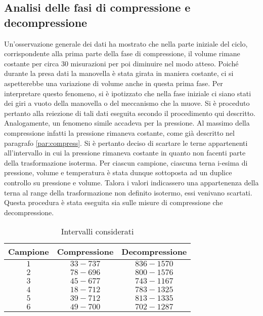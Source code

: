 \documentclass[a4paper,11pt,oneside]{article}
\begin{document}
\subsection{Analisi delle fasi di compressione e decompressione}
Un'osservazione generale dei dati ha mostrato che nella parte iniziale del ciclo, corrispondente alla prima parte della fase di compressione, il volume rimane costante per circa 30 misurazioni per poi diminuire nel modo atteso. Poiché durante la presa dati la manovella è stata girata in maniera costante, ci si aspetterebbe una variazione di volume anche in questa prima fase. Per interpretare questo fenomeno, si è ipotizzato che nella fase iniziale ci siano stati dei giri a vuoto della manovella o del meccanismo che la muove.
Si è proceduto pertanto alla reiezione di tali dati eseguita secondo il procedimento qui descritto.
Analogamente, un fenomeno simile accadeva per la pressione. Al massimo della compressione infatti la pressione rimaneva costante, come già descritto nel paragrafo \ref{par:compress}. Si è pertanto deciso di scartare le terne appartenenti all'intervallo in cui la pressione rimaneva costante in quanto non facenti parte della trasformazione isoterma.
Per ciascun campione, ciascuna terna i-esima di pressione, volume e temperatura è stata dunque sottoposta ad un duplice controllo su pressione e volume. Talora i valori indicassero una appartenenza della terna al range della trasformazione non definito isotermo, essi venivano scartati. Questa procedura è stata eseguita sia sulle misure di compressione che decompressione.

\begin{table}[h!]
    \centering
    \begin{tabular}{|c|c|c|}
        \hline
        \textbf{Campione} & \textbf{Compressione} & \textbf{Decompressione} \\ \hline
        \rowcolor[rgb]{0.85,0.85,0.85}$1$ & $33-737$ & $836-1570$ \\ \hline
        $2$ & $78-696$ & $800-1576$ \\ \hline
        \rowcolor[rgb]{0.85,0.85,0.85}$3$ & $45-677$ & $743-1167$ \\ \hline
        $4$ & $18-712$ & $783-1325$ \\ \hline
        \rowcolor[rgb]{0.85,0.85,0.85}$5$ & $39-712$ & $813-1335$ \\ \hline
        $6$ & $49-700$ & $702-1287$ \\ \hline
    \end{tabular}
    \caption{Intervalli considerati}
    \label{tab:misure_scartate}
\end{table}
\end{document}
